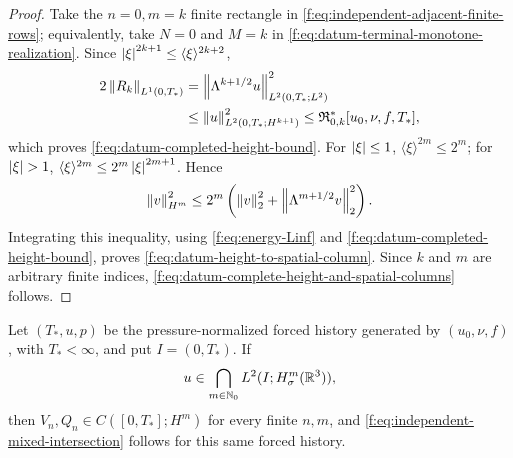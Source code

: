 \begin{samepage}
\begin{proof}
Take the \(n=0,m=k\) finite rectangle in
\eqref{f:eq:independent-adjacent-finite-rows}; equivalently, take \(N=0\) and
\(M=k\) in \eqref{f:eq:datum-terminal-monotone-realization}.  Since
\(\left|\xi\right|^{2k+1}\le\langle\xi\rangle^{2k+2}\),
\begin{align*}
 2\left\lVert R_k\right\rVert_{L^1(0,T_*)}
 &=\left\lVert \Lambda^{k+1/2}u\right\rVert_{L^2(0,T_*;L^2)}^2\\
 &\le\left\lVert u\right\rVert_{L^2(0,T_*;H^{k+1})}^2
 \le\mathfrak R_{0,k}^*[u_0,\nu,f,T_*],
\end{align*}
which proves \eqref{f:eq:datum-completed-height-bound}.  For
\(\left|\xi\right|\le1\),
\(\langle\xi\rangle^{2m}\le2^m\); for \(\abs\xi>1\),
\(\langle\xi\rangle^{2m}\le2^m\left|\xi\right|^{2m+1}\).  Hence
\[
 \left\lVert v\right\rVert_{H^m}^2
 \le2^m\left(\left\lVert v\right\rVert_2^2+
 \left\lVert \Lambda^{m+1/2}v\right\rVert_2^2\right).
\]
Integrating this inequality, using
\eqref{f:eq:energy-Linf} and
\eqref{f:eq:datum-completed-height-bound}, proves
\eqref{f:eq:datum-height-to-spatial-column}.  Since \(k\) and \(m\) are
arbitrary finite indices, \eqref{f:eq:datum-complete-height-and-spatial-columns}
follows.
\end{proof}
\end{samepage}

\begin{proposition}
\label{f:prop:forced-spatial-column-reconstruction}
Let \((T_*,u,p)\) be the pressure-normalized forced history generated by
\((u_0,\nu,f)\), with \(T_*<\infty\), and put \(I=(0,T_*)\).  If
\begin{equation}
 u\in\bigcap_{m\in\mathbb N_0}L^2(I;H^m_\sigma(\mathbb R^3)),
 \label{f:eq:forced-complete-spatial-row}
\end{equation}
then \(V_n,Q_n\in C([0,T_*];H^m)\) for every finite \(n,m\), and
\eqref{f:eq:independent-mixed-intersection} follows for this same forced
history.
\end{proposition}

